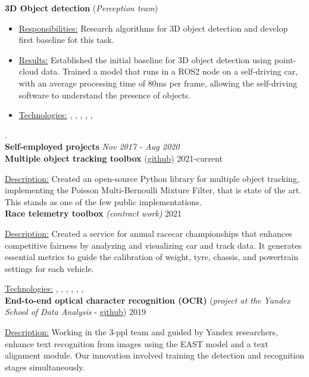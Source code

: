 \textbf{3D Object detection} (\textit{Perception team})
\begin{itemize}
    \item[] \underline{Responsibilities:} Research algorithms for 3D object detection and develop first baseline fot this task.
    \item[] \underline{Results:} Established the initial baseline for 3D object detection using point-cloud data. Trained a model that runs in a ROS2 node on a self-driving car, with an average processing time of 80ms per frame, allowing the self-driving software to understand the presence of objects.
    \item[] \underline{Technologies:} , , ,  , , 
\end{itemize}
\par .\\
%
\textbf{Self-employed projects}  \hfill \textit{Nov 2017 - Aug 2020}  
\\
\textbf{Multiple object tracking toolbox} (\href{https://github.com/neer201/Multi-Object-Tracking-for-Automotive-Systems-in-python}{github}) \hfill 2021-current

\underline{Description:} Created an open-source Python library for multiple object tracking, implementing the Poisson Multi-Bernoulli Mixture Filter, that is state of the art. This stands as one of the few public implementations.\\
\textbf{Race telemetry toolbox} \textit{(contract work)} \hfill 2021
\par
\underline{Description:} Created a service for annual racecar championships that enhances competitive fairness by analyzing and visualizing car and track data. It generates essential metrics to guide the calibration of weight, tyre, chassis, and powertrain settings for each vehicle.

\underline{Technologies:} , , , , , , 
\\
\textbf{End-to-end optical character recognition (OCR)} (\textit{project at the Yandex School of Data Analysis} - \href{https://github.com/neer201/end2end_OCR}{github})  \hfill 2019
\par
\underline{Description:} Working in the 3-ppl team and guided by Yandex researchers, enhance text recognition from images using the EAST model and a text alignment module. Our innovation involved training the detection and recognition stages simultaneously.

